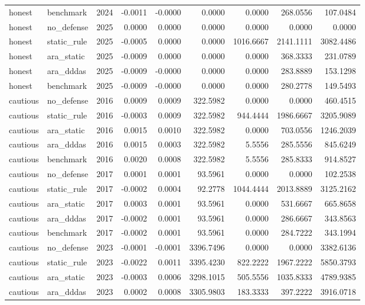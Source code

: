 \begin{tabular}{llrrrrrrr}
honest & benchmark & 2024 & -0.0011 & -0.0000 & 0.0000 & 0.0000 & 268.0556 & 107.0484 \\
honest & no_defense & 2025 & 0.0000 & 0.0000 & 0.0000 & 0.0000 & 0.0000 & 0.0000 \\
honest & static_rule & 2025 & -0.0005 & 0.0000 & 0.0000 & 1016.6667 & 2141.1111 & 3082.4486 \\
honest & ara_static & 2025 & -0.0009 & 0.0000 & 0.0000 & 0.0000 & 368.3333 & 231.0789 \\
honest & ara_dddas & 2025 & -0.0009 & -0.0000 & 0.0000 & 0.0000 & 283.8889 & 153.1298 \\
honest & benchmark & 2025 & -0.0009 & -0.0000 & 0.0000 & 0.0000 & 280.2778 & 149.5493 \\
cautious & no_defense & 2016 & 0.0009 & 0.0009 & 322.5982 & 0.0000 & 0.0000 & 460.4515 \\
cautious & static_rule & 2016 & -0.0003 & 0.0009 & 322.5982 & 944.4444 & 1986.6667 & 3205.9089 \\
cautious & ara_static & 2016 & 0.0015 & 0.0010 & 322.5982 & 0.0000 & 703.0556 & 1246.2039 \\
cautious & ara_dddas & 2016 & 0.0015 & 0.0003 & 322.5982 & 5.5556 & 285.5556 & 845.6249 \\
cautious & benchmark & 2016 & 0.0020 & 0.0008 & 322.5982 & 5.5556 & 285.8333 & 914.8527 \\
cautious & no_defense & 2017 & 0.0001 & 0.0001 & 93.5961 & 0.0000 & 0.0000 & 102.2538 \\
cautious & static_rule & 2017 & -0.0002 & 0.0004 & 92.2778 & 1044.4444 & 2013.8889 & 3125.2162 \\
cautious & ara_static & 2017 & 0.0003 & 0.0001 & 93.5961 & 0.0000 & 531.6667 & 665.8658 \\
cautious & ara_dddas & 2017 & -0.0002 & 0.0001 & 93.5961 & 0.0000 & 286.6667 & 343.8563 \\
cautious & benchmark & 2017 & -0.0002 & 0.0001 & 93.5961 & 0.0000 & 284.7222 & 343.1994 \\
cautious & no_defense & 2023 & -0.0001 & -0.0001 & 3396.7496 & 0.0000 & 0.0000 & 3382.6136 \\
cautious & static_rule & 2023 & -0.0022 & 0.0011 & 3395.4230 & 822.2222 & 1967.2222 & 5850.3793 \\
cautious & ara_static & 2023 & -0.0003 & 0.0006 & 3298.1015 & 505.5556 & 1035.8333 & 4789.9385 \\
cautious & ara_dddas & 2023 & 0.0002 & 0.0008 & 3305.9803 & 183.3333 & 397.2222 & 3916.0718 \\

\end{tabular}
